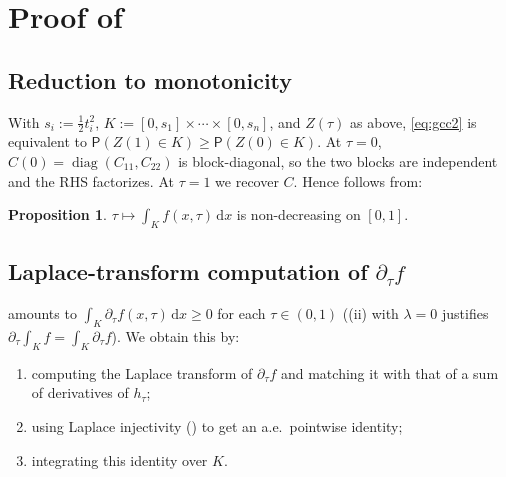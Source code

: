 \documentclass[12pt,a4paper]{article}
\theoremstyle{definition}
\newtheorem{proposition}[theorem]{Proposition}
\newcommand{\PP}{\mathsf{P}}
\newcommand{\diag}{\operatorname{diag}}
\newcommand{\dd}{\mathrm{d}}
\begin{document}
\section{Proof of \texorpdfstring{}{the reduced theorem}}\label{sec:proof}

\subsection{Reduction to monotonicity}

With $s_i:=\tfrac{1}{2}t_i^2$, $K:=[0,s_1]\times\cdots\times[0,s_n]$,
and $Z(\tau)$ as above, \eqref{eq:gcc2} is equivalent to
$\PP(Z(1)\in K)\geqslant\PP(Z(0)\in K)$.  At $\tau=0$,
$C(0)=\diag(C_{11},C_{22})$ is block-diagonal, so the two blocks are
independent and the RHS factorizes.  At $\tau=1$ we recover $C$.
Hence  follows from:

\begin{proposition}\label{prop:key}
  $\tau\mapsto\int_K f(x,\tau)\,\dd x$ is non-decreasing on $[0,1]$.
\end{proposition}

\subsection{Laplace-transform computation of \texorpdfstring{$\partial_\tau f$}{the tau-derivative of f}}

 amounts to $\int_K\partial_\tau f(x,\tau)\,\dd x\geqslant 0$
for each $\tau\in(0,1)$ ((ii) with $\lambda=0$ justifies
$\partial_\tau\int_K f=\int_K\partial_\tau f$).  We obtain this by:
\begin{enumerate}[label=(\alph*)]
  \item computing the Laplace transform of $\partial_\tau f$ and
    matching it with that of a sum of derivatives of $h_\tau$;
  \item using Laplace injectivity () to get an
    a.e.\ pointwise identity;
  \item integrating this identity over $K$.
\end{enumerate}
\end{document}
